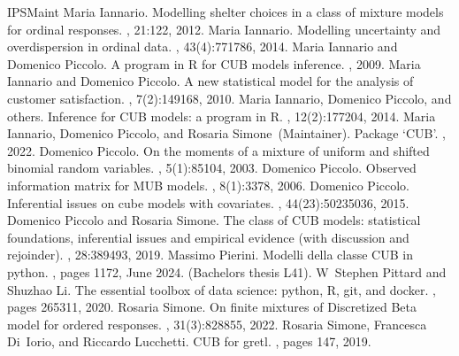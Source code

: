\documentclass[letterpaper,10pt,english]{sphinxmanual}
\begin{document}
\begin{sphinxthebibliography}{IPSMaint}
\sphinxAtStartPar
Maria Iannario. Modelling shelter choices in a class of mixture models for ordinal responses. , 21:1\textendash{}22, 2012.
\sphinxAtStartPar
Maria Iannario. Modelling uncertainty and overdispersion in ordinal data. , 43(4):771\textendash{}786, 2014.
\sphinxAtStartPar
Maria Iannario and Domenico Piccolo. A program in R for CUB models inference. , 2009.
\sphinxAtStartPar
Maria Iannario and Domenico Piccolo. A new statistical model for the analysis of customer satisfaction. , 7(2):149\textendash{}168, 2010.
\sphinxAtStartPar
Maria Iannario, Domenico Piccolo, and others. Inference for CUB models: a program in R. , 12(2):177\textendash{}204, 2014.
\sphinxAtStartPar
Maria Iannario, Domenico Piccolo, and Rosaria Simone (Maintainer). Package ‘CUB’. , 2022.
\sphinxAtStartPar
Domenico Piccolo. On the moments of a mixture of uniform and shifted binomial random variables. , 5(1):85\textendash{}104, 2003.
\sphinxAtStartPar
Domenico Piccolo. Observed information matrix for MUB models. , 8(1):33\textendash{}78, 2006.
\sphinxAtStartPar
Domenico Piccolo. Inferential issues on cube models with covariates. , 44(23):5023\textendash{}5036, 2015.
\sphinxAtStartPar
Domenico Piccolo and Rosaria Simone. The class of CUB models: statistical foundations, inferential issues and empirical evidence (with discussion and rejoinder). , 28:389\textendash{}493, 2019.
\sphinxAtStartPar
Massimo Pierini. Modelli della classe CUB in python. , pages 1\textendash{}172, June 2024. (Bachelor\textquotesingle{}s thesis L\sphinxhyphen{}41).
\sphinxAtStartPar
W Stephen Pittard and Shuzhao Li. The essential toolbox of data science: python, R, git, and docker. , pages 265\textendash{}311, 2020.
\sphinxAtStartPar
Rosaria Simone. On finite mixtures of Discretized Beta model for ordered responses. , 31(3):828\textendash{}855, 2022.
\sphinxAtStartPar
Rosaria Simone, Francesca Di Iorio, and Riccardo Lucchetti. CUB for gretl. , pages 147, 2019.
\end{sphinxthebibliography}
\end{document}
